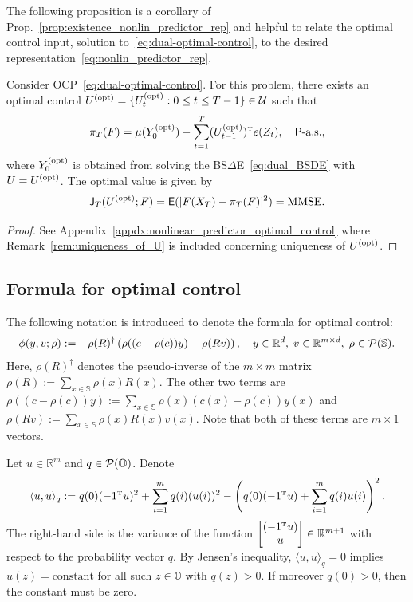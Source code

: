 \documentclass[twoside,11pt]{article}
\def\Re{\mathbb{R}}
\newcommand{\field}[1]{\mathbb{#1}}
\def\Re{\field{R}}
\def\clP{{\cal P}}
\def\E{{\sf E}}
\def\bS{\begin{slide}}
\newcommand{\newP}[1]{\medskip\noindent{\bf #1:}}
\def\Re{\mathbb{R}}
\def\E{{\sf E}}
\def\Prop#1{Prop.~\ref{#1}}
\def\clP{{\cal P}}
\renewcommand{\Re}{\mathbb{R}}
\def\clP{{\cal P}}
\def\clU{{\cal U}}
\def\E{{\sf E}}
\def\bS{\mathbb{S}}
\def\bO{\mathbb{O}}
\def\sJ{{\sf J}}
\def\sP{{\sf P}}
\def\tp{{\hbox{\rm\tiny T}}}
\def\opt{{\text{\rm (opt)}}}
\begin{document}
The following proposition is a corollary of \Prop{prop:existence_nonlin_predictor_rep} and helpful to relate the optimal control input, solution to~\eqref{eq:dual-optimal-control}, to the desired representation~\eqref{eq:nonlin_predictor_rep}.  
  
\begin{proposition} \label{prop:nonlinear_predictor_optimal_control}
  Consider OCP~\eqref{eq:dual-optimal-control}.  
  For this problem, there exists an optimal control $U^\opt = \{U_t^\opt:0\le t \le T-1\} \in \clU$ such that
  \begin{align*}
    \pi_T(F) = \mu(Y_0^\opt) - \sum_{t=1}^{T} (U_{t-1}^\opt)^\tp e(Z_{t}),\quad \sP\text{-a.s.},
  \end{align*}
  where $Y_0^\opt$ is obtained from solving the BS$\Delta$E~\eqref{eq:dual_BSDE} with $U=U^\opt$.  
  The optimal value is given by
  \begin{equation*}
    \sJ_T(U^\opt;F) = \E(|F(X_T)-\pi_T(F)|^2) = \text{MMSE}.
  \end{equation*}
\end{proposition}
\begin{proof}
  See Appendix~\ref{appdx:nonlinear_predictor_optimal_control} where Remark~\ref{rem:uniqueness_of_U} is included concerning uniqueness of $U^\opt$.  
\end{proof}

       
\subsection{Formula for optimal control}

\newP{Notation} The following notation is introduced to denote the formula for optimal control:
\begin{equation*}
  \phi(y,v;\rho) := - \rho(R)^{\dagger} \left( \rho ((c-\rho (c))y)- \rho (Rv)\right), \quad y\in\Re^d, \; v\in \Re^{m\times d},\; \rho\in\clP(\bS).
\end{equation*}
Here, $\rho(R)^{\dagger}$ denotes the pseudo-inverse of the $m\times m$ matrix $\rho(R):=\sum_{x\in\bS} \rho(x) R(x)$. 
The other two terms are $\rho ((c-\rho (c))y) := \sum_{x\in\bS} \rho(x) (c(x) - \rho(c)) y(x)$ and $\rho (Rv):= \sum_{x\in\bS} \rho(x) R(x)v(x)$.  
Note that both of these terms are $m\times 1$ vectors.

Let $u\in \Re^m$ and $q\in \clP(\bO)$. Denote
\begin{equation*}
  \langle u,u \rangle_q:= q(0)(-1^\tp u)^2 + \sum_{i=1}^m q(i) (u(i))^2 -\left( q(0) (-1^\tp u) + \sum_{i=1}^mq(i) u(i) \right)^2.
\end{equation*}
The right-hand side is the variance of the function $\begin{bmatrix}(-1^\tp u) \\ u\end{bmatrix} \in \Re^{m+1}$ with respect to the probability vector $q$.
By Jensen's inequality, $\langle u,u \rangle_q=0$ implies $u(z) =
\text{constant}$ for all such $z\in\bO$ with $q(z)>0$. 
If moreover $q(0)>0$, then the constant must be zero.    
\end{document}
